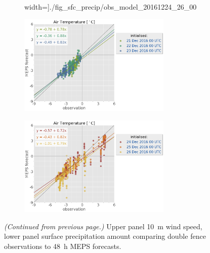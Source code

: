 \begin{figure}
\begin{subfigure}[b]{0.49\textwidth}
		width=\textwidth]{./fig_sfc_precip/obs_model_20161224_26_00}
		\caption{}\label{fig:scat:precip2426}
	\end{subfigure}
	\begin{subfigure}[b]{0.49\textwidth}
		\centering
		\includegraphics[trim={25.cm 15.5cm 0cm 3.6cm},clip,
		width=0.8\textwidth]{./fig_sfc_temp/obs_model_20161221_23_00_label}
	\end{subfigure}
	\begin{subfigure}[b]{0.49\textwidth}
		\centering
		\includegraphics[trim={25.cm 15.5cm 0cm 3.6cm},clip,
		width=0.8\textwidth]{./fig_sfc_temp/obs_model_20161224_26_00_label}
	\end{subfigure}
	\caption{\textit{(Continued from previous page.)} Upper panel \SI{10}{\metre} wind speed, lower panel surface precipitation amount comparing double fence observations to \SI{48}{\hour} MEPS forecasts. }
\end{figure}
\noindent
\\
